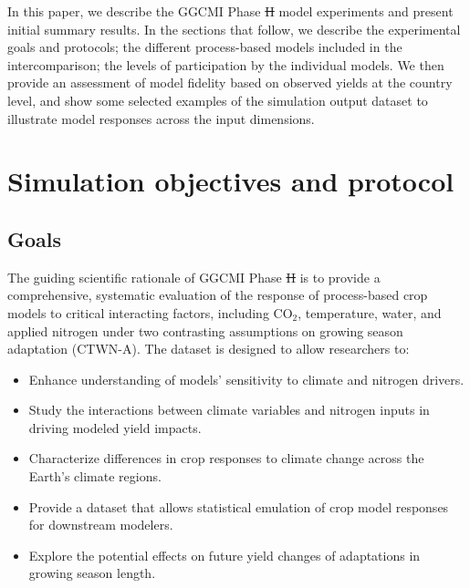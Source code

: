 \documentclass[gmd, manuscript]{copernicus} %
\providecommand{\DIFadd}[1]{{\protect\color{blue}\uwave{#1}}} %
\providecommand{\DIFdel}[1]{{\protect\color{red}\sout{#1}}}                      %
\providecommand{\DIFaddbegin}{} %
\providecommand{\DIFaddend}{} %
\providecommand{\DIFdelbegin}{} %
\providecommand{\DIFdelend}{} %
\begin{document}
In this paper, we describe the GGCMI Phase \DIFdelbegin \DIFdel{II }\DIFdelend \DIFaddbegin \DIFadd{2 }\DIFaddend model experiments and present initial summary results.
In the sections that follow, we describe the experimental goals and protocols; the different process-based models included in the intercomparison; the levels of participation by the individual models. We then provide an assessment of model fidelity based on observed yields at the country level, and show some selected examples of the simulation output dataset to illustrate model responses across the input dimensions.

\section{Simulation objectives and protocol}
\label{S:2}
\subsection{Goals}

The guiding scientific rationale of GGCMI Phase \DIFdelbegin \DIFdel{II }\DIFdelend \DIFaddbegin \DIFadd{2 }\DIFaddend is to provide a comprehensive, systematic evaluation of the response of process-based crop models to critical interacting factors, including CO$_2$, temperature, water, and applied nitrogen under two contrasting assumptions on growing season adaptation (CTWN-A). 
The dataset is designed to allow researchers to:
\begin{itemize}
    \item Enhance understanding of models’ sensitivity to climate and nitrogen drivers.
    \item Study the interactions between climate variables and nitrogen inputs in driving modeled yield impacts. 
    \item Characterize differences in crop responses to climate change across the Earth's climate regions.
    \item Provide a dataset that allows statistical emulation of crop model responses for downstream modelers.
    \item Explore the potential effects on future yield changes of adaptations in growing season length.
\end{itemize}
\vspace{-0.05in}
\end{document}
